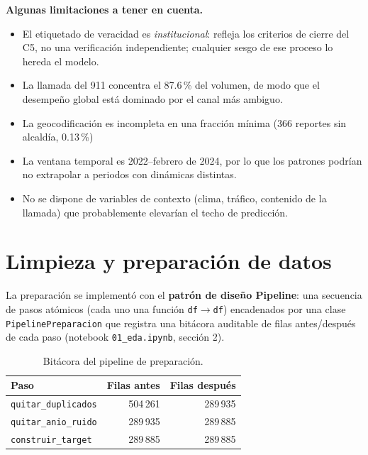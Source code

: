 \documentclass[11pt,letterpaper]{article}
\begin{document}
\textbf{Algunas limitaciones a tener en cuenta.} 
\begin{itemize}
  \item El etiquetado de veracidad es \emph{institucional}: refleja los criterios de cierre del C5,
   no una verificación independiente; cualquier sesgo de ese proceso lo hereda el modelo.
  \item La llamada del 911 concentra el 87.6\,\% del volumen, de modo que
  el desempeño global está dominado por el canal más ambiguo.
  \item La geocodificación es incompleta en una fracción mínima (366 reportes sin
  alcaldía, 0.13\,\%)
  \item La ventana temporal es 2022--febrero de 2024, por lo que los patrones podrían
   no extrapolar a periodos con dinámicas distintas.
  \item No se dispone de variables de contexto (clima, tráfico, contenido de la 
  llamada) que probablemente elevarían el techo de predicción.
\end{itemize}
  


\section{Limpieza y preparación de datos}
\label{sec:limpieza}

La preparación se implementó con el \textbf{patrón de diseño Pipeline}: una
secuencia de pasos atómicos (cada uno una función
\texttt{df}$\rightarrow$\texttt{df}) encadenados por una clase
\texttt{PipelinePreparacion} que registra una bitácora auditable de filas
antes/después de cada paso (notebook \texttt{01\_eda.ipynb}, sección 2).

\begin{table}[H]
\centering
\caption{Bitácora del pipeline de preparación.}
\label{tab:pipe}
\small
\begin{tabular}{@{}lrr@{}}
\toprule
\textbf{Paso} & \textbf{Filas antes} & \textbf{Filas después}\\
\midrule
\texttt{quitar\_duplicados} & 504\,261 & 289\,935\\
\texttt{quitar\_anio\_ruido} & 289\,935 & 289\,885\\
\texttt{construir\_target} & 289\,885 & 289\,885\\
\bottomrule
\end{tabular}
\end{table}
\end{document}
